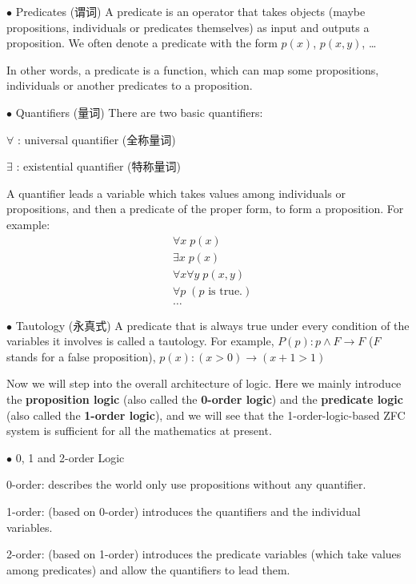 \documentclass{article}
\begin{document}
\begin{Df}{$\bullet$ Predicates (谓词)}
    A predicate is an operator that takes objects (maybe propositions, individuals or predicates themselves) as input and outputs a proposition. We often denote a predicate with the form $p(x)$, $p(x,y)$, \dots
\end{Df}

In other words, a predicate is a function, which can map some propositions, individuals or another predicates to a proposition.

\begin{Df}{$\bullet$ Quantifiers (量词)}
    There are two basic quantifiers:
    \begin{compactitem}
        \item $\forall$ : universal quantifier (全称量词)
        \item $\exists$ : existential quantifier (特称量词)
    \end{compactitem}
    A quantifier leads a variable which takes values among individuals or propositions, and then a predicate of the proper form, to form a proposition. For example:
    \begin{align*}
        &\forall x\;p(x)\\
        &\exists x\; p(x)\\
        &\forall x\forall y\; p(x,y)\\
        &\forall p\; (p \text{ is true.})\\
        &\dots
    \end{align*}
\end{Df}

\begin{Df}{$\bullet$ Tautology (永真式)}
    A predicate that is always true under every condition of the variables it involves is called a tautology. For example, $P(p): p\land F \rightarrow F$ ($F$ stands for a false proposition), $p(x): (x>0)\rightarrow (x+1>1) $ 
\end{Df}

Now we will step into the overall architecture of logic. Here we mainly introduce the \textbf{proposition logic} (also called the \textbf{0-order logic}) and the \textbf{predicate logic} (also called the \textbf{1-order logic}), and we will see that the 1-order-logic-based ZFC system is sufficient for all the mathematics at present.

\begin{Df}{$\bullet$ 0, 1 and 2-order Logic}
    \begin{compactitem}
        \item 0-order: describes the world only use propositions without any quantifier.
        \item 1-order: (based on 0-order) introduces the quantifiers and the individual variables.
        \item 2-order: (based on 1-order) introduces the predicate variables (which take values among predicates) and allow the quantifiers to lead them.
    \end{compactitem}
\end{Df}
\end{document}
